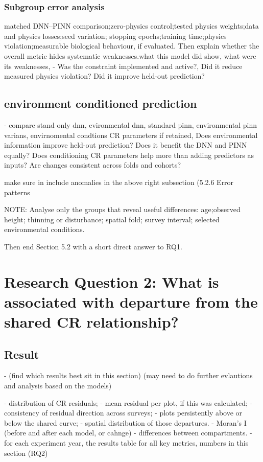 \subsubsection{Subgroup error analysis}
matched DNN–PINN comparison;zero-physics control;tested physics weights;data and physics losses;seed variation;
stopping epochs;training time;physics violation;measurable biological behaviour, if evaluated.
Then explain whether the overall metric hides systematic weaknesses.what this model did show, what were its weaknesses, 
- Was the constraint implemented and active?, Did it reduce measured physics violation? Did it improve held-out prediction?
\subsection{environment conditioned prediction}
- compare stand only dnn, evironmental dnn, standard pinn, environmental pinn varians, envirnomental condtions CR parameters if retained, Does environmental information improve held-out prediction?
Does it benefit the DNN and PINN equally?
Does conditioning CR parameters help more than adding predictors as inputs?
Are changes consistent across folds and cohorts? 

make sure in include anomalies  in the above right subsection (5.2.6 Error patterns

NOTE: Analyse only the groups that reveal useful differences: age;observed height; thinning or disturbance; spatial fold; survey interval; selected environmental conditions.

Then end Section 5.2 with a short direct answer to RQ1.
\section{Research Question 2: What is associated with departure from the shared CR relationship?} 
\subsection{Result}
- (find which results best sit in this section) (may need to do further evlautions and analysis based on the models) 

- distribution of CR residuals;
- mean residual per plot, if this was calculated;
- consistency of residual direction across surveys;
- plots persistently above or below the shared curve;
- spatial distribution of those departures.
- Moran’s I (before and after each model, or cahnge) 
- differences between compartments.
- for each experiment year, 
the results table for all key metrics, numbers in this section (RQ2) 

